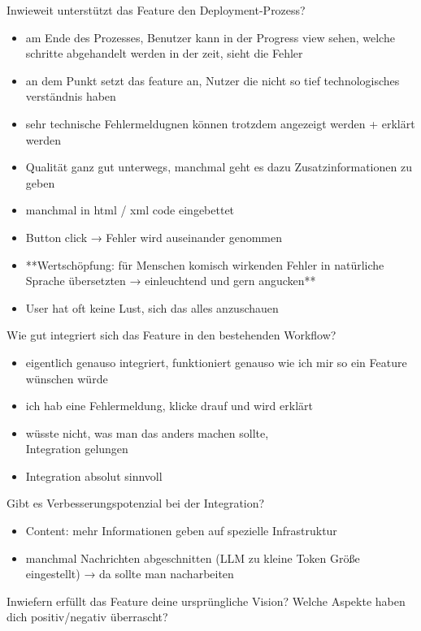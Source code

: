 \documentclass[
  a4paper,
  12pt,
  oneside,
  open=any,
  BCOR=12mm,
  DIV=14,
  parskip=half*,
  headsepline,
  footsepline,
  pointlessnumbers,
  liststotoc,
  numbers=noenddot,
  listof=totoc]{scrartcl}
\providecommand{\tightlist}{%
  \setlength{\itemsep}{0pt}\setlength{\parskip}{0pt}}\usepackage{longtable,booktabs,array}
\begin{document}
Inwieweit unterstützt das Feature den Deployment-Prozess?

\begin{itemize}
\tightlist
\item
  am Ende des Prozesses, Benutzer kann in der Progress view sehen,
  welche schritte abgehandelt werden in der zeit, sieht die Fehler
\item
  an dem Punkt setzt das feature an, Nutzer die nicht so tief
  technologisches verständnis haben
\item
  sehr technische Fehlermeldugnen können trotzdem angezeigt werden +
  erklärt werden
\item
  Qualität ganz gut unterwegs, manchmal geht es dazu Zusatzinformationen
  zu geben
\item
  manchmal in html / xml code eingebettet
\item
  Button click → Fehler wird auseinander genommen
\item
  **Wertschöpfung: für Menschen komisch wirkenden Fehler in natürliche
  Sprache übersetzten → einleuchtend und gern angucken**
\item
  User hat oft keine Lust, sich das alles anzuschauen
\end{itemize}

Wie gut integriert sich das Feature in den bestehenden Workflow?

\begin{itemize}
\tightlist
\item
  eigentlich genauso integriert, funktioniert genauso wie ich mir so ein
  Feature wünschen würde
\item
  ich hab eine Fehlermeldung, klicke drauf und wird erklärt
\item
  wüsste nicht, was man das anders machen sollte,\\
  Integration gelungen
\item
  Integration absolut sinnvoll
\end{itemize}

Gibt es Verbesserungspotenzial bei der Integration?

\begin{itemize}
\tightlist
\item
  Content: mehr Informationen geben auf spezielle Infrastruktur
\item
  manchmal Nachrichten abgeschnitten (LLM zu kleine Token Größe
  eingestellt) → da sollte man nacharbeiten
\end{itemize}

Inwiefern erfüllt das Feature deine ursprüngliche Vision? Welche Aspekte
haben dich positiv/negativ überrascht?
\end{document}
